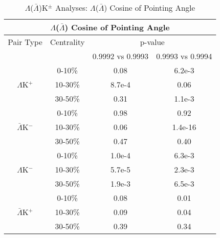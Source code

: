 \documentclass[../AnalysisNoteJBuxton.tex]{subfiles}
\begin{document}
\begin{table}
 \centering
 \begin{tabular}{|c|c|c|c|}
 \multicolumn{4}{c}{$\Lambda$($\bar{\Lambda}$) Cosine of Pointing Angle} \\
  \hline
  Pair Type & Centrality & \multicolumn{2}{c|}{p-value} \\
  \cline{3-4}
   & & 0.9992 vs 0.9993 & 0.9993 vs 0.9994 \\
  \hline
   & 0-10\% & 0.08 & 6.2e-3 \\
  $\Lambda$K$^{+}$ 
   & 10-30\% & 8.7e-4 & 0.06 \\
   & 30-50\% & 0.31 & 1.1e-3 \\
  \hline
   & 0-10\% & 0.98 & 0.92 \\
  $\bar{\Lambda}$K$^{-}$ 
   & 10-30\% & 0.06 & 1.4e-16 \\
   & 30-50\% & 0.47 & 0.40 \\
  \hline \hline
   & 0-10\% & 1.0e-4 & 6.3e-3 \\
  $\Lambda$K$^{-}$ 
   & 10-30\% & 5.7e-5 & 2.3e-3 \\
   & 30-50\% & 1.9e-3 & 6.5e-3 \\
  \hline
   & 0-10\% & 0.08 & 0.01 \\
  $\bar{\Lambda}$K$^{+}$ 
   & 10-30\% & 0.09 & 0.04 \\
   & 30-50\% & 0.39 & 0.34 \\
  \hline
 \end{tabular}
 \caption{$\Lambda$($\bar{\Lambda}$)K$^{\pm}$ Analyses: $\Lambda$($\bar{\Lambda}$) Cosine of Pointing Angle}
 \label{tab:LamCosPointingAngleLamKch}
\end{table}
\end{document}
